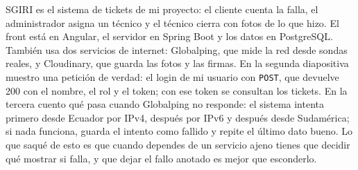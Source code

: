 SGIRI es el sistema de tickets de mi proyecto: el cliente cuenta la falla, el administrador asigna un técnico y el técnico cierra con fotos de lo que hizo. El front está en Angular, el servidor en Spring Boot y los datos en PostgreSQL. También usa dos servicios de internet: Globalping, que mide la red desde sondas reales, y Cloudinary, que guarda las fotos y las firmas. En la segunda diapositiva muestro una petición de verdad: el login de mi usuario con \texttt{POST}, que devuelve 200 con el nombre, el rol y el token; con ese token se consultan los tickets. En la tercera cuento qué pasa cuando Globalping no responde: el sistema intenta primero desde Ecuador por IPv4, después por IPv6 y después desde Sudamérica; si nada funciona, guarda el intento como fallido y repite el último dato bueno. Lo que saqué de esto es que cuando dependes de un servicio ajeno tienes que decidir qué mostrar si falla, y que dejar el fallo anotado es mejor que esconderlo.
